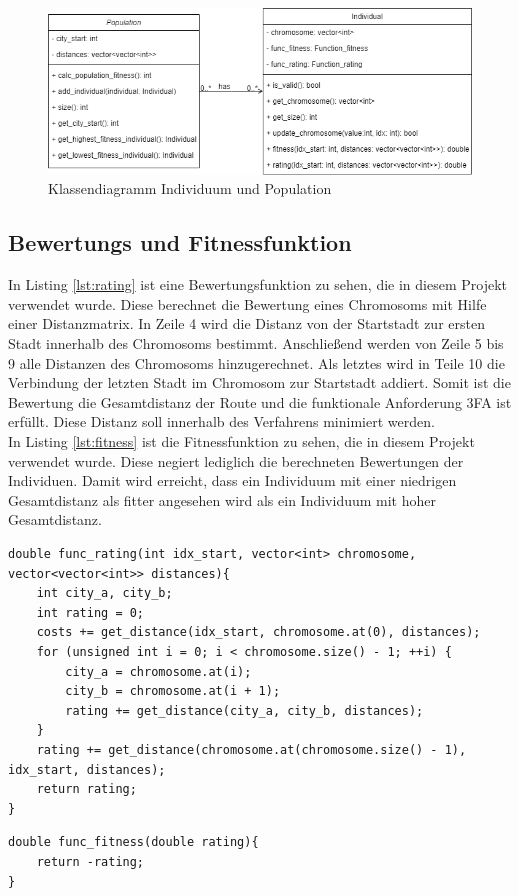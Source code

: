 \begin{figure}[H]
\centering
\includegraphics[width=1\textwidth]{img/Vortrag/uml.png}
\caption{Klassendiagramm Individuum und Population}
\label{fig:klassendiagramm}
\end{figure}


\subsection{Bewertungs und Fitnessfunktion}
In Listing \ref{lst:rating} ist eine Bewertungsfunktion zu sehen, die in diesem Projekt verwendet wurde. Diese berechnet die Bewertung eines Chromosoms mit Hilfe einer Distanzmatrix. In Zeile 4 wird die Distanz von der Startstadt zur ersten Stadt innerhalb des Chromosoms bestimmt. Anschließend werden von Zeile 5 bis 9 alle Distanzen des Chromosoms hinzugerechnet. Als letztes wird in Teile 10 die Verbindung der letzten Stadt im Chromosom zur Startstadt addiert. Somit ist die Bewertung die Gesamtdistanz der Route und die funktionale Anforderung 3FA ist erfüllt. Diese Distanz soll innerhalb des Verfahrens minimiert werden.\\
In Listing \ref{lst:fitness} ist die Fitnessfunktion zu sehen, die in diesem Projekt verwendet wurde. Diese negiert lediglich die berechneten Bewertungen der Individuen. Damit wird erreicht, dass ein Individuum mit einer niedrigen Gesamtdistanz als fitter angesehen wird als ein Individuum mit hoher Gesamtdistanz.

\begin{minipage}{\linewidth}
\begin{lstlisting}[caption={Beispiel einer Ratingfunktion}, firstnumber=1, captionpos=b, label=lst:rating]
double func_rating(int idx_start, vector<int> chromosome, vector<vector<int>> distances){
	int city_a, city_b;
	int rating = 0;
	costs += get_distance(idx_start, chromosome.at(0), distances);
	for (unsigned int i = 0; i < chromosome.size() - 1; ++i) {
		city_a = chromosome.at(i);
		city_b = chromosome.at(i + 1);
		rating += get_distance(city_a, city_b, distances);
	}
	rating += get_distance(chromosome.at(chromosome.size() - 1), idx_start, distances);
	return rating;
}
\end{lstlisting}
\end{minipage}
\begin{minipage}{\linewidth}
\begin{lstlisting}[caption={Beispiel einer Fitnessfunktion}, firstnumber=1, captionpos=b, label=lst:fitness]
double func_fitness(double rating){
	return -rating;
}
\end{lstlisting}
\end{minipage}
